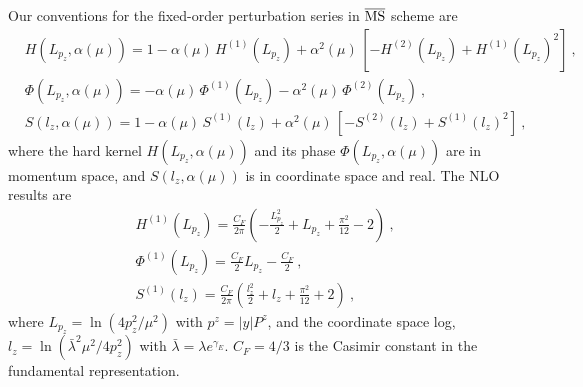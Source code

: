 \documentclass[a4paper,11pt]{article}
\begin{document}
Our conventions for the fixed-order perturbation series in $\overline{\rm MS}$ scheme are
\begin{align}
    &H(L_{p_z},\alpha(\mu)) = 1 - \alpha(\mu) \, H^{(1)}(L_{p_z}) + \alpha^2(\mu) \, \left[-H^{(2)}(L_{p_z})+H^{(1)}(L_{p_z})^2\right]\ ,  \nonumber\\
    &\Phi(L_{p_z},\alpha(\mu)) = - \alpha(\mu) \, \Phi^{(1)}(L_{p_z}) - \alpha^2(\mu) \, \Phi^{(2)}(L_{p_z}) \ , \nonumber\\    
    &S(l_z,\alpha(\mu)) = 1 - \alpha(\mu) \, S^{(1)}(l_z) + \alpha^2(\mu) \, \left[-S^{(2)}(l_z)+S^{(1)}(l_z)^2\right] \ , 
\end{align}
where the hard kernel $H(L_{p_z},\alpha(\mu))$ and its phase $\Phi(L_{p_z},\alpha(\mu))$ are in momentum space, and $S(l_z,\alpha(\mu))$ is in coordinate space and real. 
The NLO results are~\cite{Ji:2021znw,Ji:2023pba}
\begin{align}
&H^{(1)}(L_{p_z}) = \frac{C_F}{2\pi}\left( -\frac{L_{p_z}^2}{2} + L_{p_z} + \frac{\pi^2}{12} -2 \right) \ , \nonumber\\
&\Phi^{(1)}(L_{p_z}) = \frac{C_F}{2} L_{p_z} -\frac{C_F}{2} \ , \nonumber\\
&S^{(1)}(l_z) = \frac{C_F}{2\pi} \left( \frac{l_z^2}{2} + l_z + \frac{\pi^2}{12} + 2 \right) \ , 
\end{align}
where $L_{p_z}=\ln\left(4 p_z^2/\mu^2\right)$ with $p^z=|y|P^z$, and the coordinate space log, $l_z=\ln\left(\bar{\lambda}^2\mu^2/4 p_z^2\right)$ with $\bar{\lambda} = \lambda e^{\gamma_E}$. $C_F=4/3$ is the Casimir constant in the fundamental representation.
\end{document}
